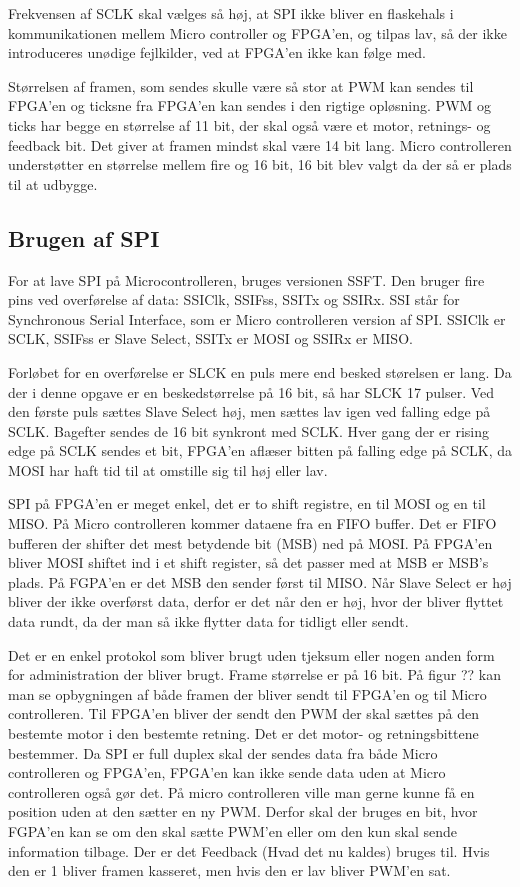 Frekvensen af SCLK skal vælges så høj, at SPI ikke bliver en flaskehals i kommunikationen mellem Micro controller og FPGA’en, og tilpas lav, så der ikke introduceres unødige fejlkilder, ved at FPGA’en ikke kan følge med.

Størrelsen af framen, som sendes skulle være så stor at PWM kan sendes til FPGA’en og ticksne fra FPGA’en kan sendes i den rigtige opløsning. PWM og ticks har begge en størrelse af 11 bit, der skal også være et motor, retnings- og feedback bit.  Det giver at framen mindst skal være 14 bit lang. Micro controlleren understøtter en størrelse mellem fire og 16 bit, 16 bit blev valgt da der så er plads til at udbygge.



\subsection{Brugen af SPI}

For at lave SPI på Microcontrolleren, bruges versionen SSFT. Den bruger fire pins ved overførelse af data: SSIClk, SSIFss, SSITx og SSIRx. SSI står for Synchronous Serial Interface, som er Micro controlleren version af SPI. SSIClk er SCLK, SSIFss er Slave Select, SSITx er MOSI og SSIRx er MISO.

Forløbet for en overførelse er SLCK en puls mere end besked størelsen er lang. Da der i denne opgave er en beskedstørrelse på 16 bit, så har SLCK 17 pulser. Ved den første puls sættes Slave Select høj, men sættes lav igen ved falling edge på SCLK. Bagefter sendes de 16 bit synkront med SCLK. Hver gang der er rising edge på SCLK sendes et bit, FPGA’en aflæser bitten på falling edge på SCLK, da MOSI har haft tid til at omstille sig til høj eller lav.

SPI på FPGA’en er meget enkel, det er to shift registre, en til MOSI og en til MISO. På Micro controlleren kommer dataene fra en FIFO buffer. Det er FIFO bufferen der shifter det mest betydende bit (MSB) ned på MOSI. På FPGA’en bliver MOSI shiftet ind i et shift register, så det passer med at MSB er MSB’s plads. På FGPA’en er det MSB den sender først til MISO. Når Slave Select er høj bliver der ikke overførst data, derfor er det når den er høj, hvor der bliver flyttet data rundt, da der man så ikke flytter data for tidligt eller sendt. 

Det er en enkel protokol som bliver brugt uden tjeksum eller nogen anden form for administration der bliver brugt. Frame størrelse er på 16 bit. På figur ?? kan man se opbygningen af både framen der bliver sendt til FPGA’en og til Micro controlleren. Til FPGA’en bliver der sendt den PWM der skal sættes på den bestemte motor i den bestemte retning. Det er det motor- og retningsbittene bestemmer. Da SPI er full duplex skal der sendes data fra både Micro controlleren og FPGA’en, FPGA’en kan ikke sende data uden at Micro controlleren også gør det. På micro controlleren ville man gerne kunne få en position uden at den sætter en ny PWM. Derfor skal der bruges en bit, hvor FGPA’en kan se om den skal sætte PWM’en eller om den kun skal sende information tilbage. Der er det Feedback (Hvad det nu kaldes) bruges til. Hvis den er 1 bliver framen kasseret, men hvis den er lav bliver PWM’en sat.  
